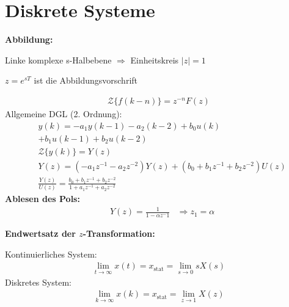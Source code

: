 \setcounter{section}{16}
\section{Diskrete Systeme}
\begin{tcolorbox}[colback=white!10!white,
                  colframe=green!30!black,
                  title=Zusammenhang $s$ und $z$]
\textbf{Abbildung:}

Linke komplexe s-Halbebene $\Longrightarrow$ Einheitskreis $|z|=1$

$z = e^{sT}$ ist die Abbildungsvorschrift
\end{tcolorbox}

\begin{tcolorbox}[colback=white!10!white,
                  colframe=green!30!black,
                  title=$z$-Übertragungsfunktion]
    \begin{align*}
        \mathcal{Z}\{ f(k-n)\} = z^{-n}F(z)
    \end{align*}
    Allgemeine DGL (2. Ordnung):
    \begin{align*}
        &y(k)    = -a_1y(k-1)-a_2(k-2)+b_0u(k)\\&+b_1u(k-1)+b_2u(k-2)\\
        &\mathcal{Z}\{ y(k)\}  = Y(z)\\
        &Y(z) = (-a_1z^{-1}-a_2z^{-2})Y(z) 
        +(b_0+b_1z^{-1}+b_2z^{-2})U(z)\\
        &\frac{Y(z)}{U(z)} = \frac{b_0+b_1z^{-1}+b_2z^{-2}}{1+a_1z^{-1}+a_2z^{-2}}
    \end{align*}
    \textbf{Ablesen des Pols:}
    \begin{align*}
        & Y(z) = \frac{1}{1-\alpha z^-1} &\Rightarrow z_1 = \alpha
    \end{align*}
    \begin{tcolorbox}[colback=white!10!white,colframe=green!30!black]
        \textbf{Endwertsatz der $z$-Transformation:}
        
        Kontinuierliches System:
        \begin{align*}
            \lim\limits_{t\to\infty} x(t) = x_{\text{stat}} = \lim\limits_{s\to 0 }sX(s)
        \end{align*}
        Diskretes System:
        \begin{align*}
             \lim\limits_{k\to\infty} x(k) =  x_{\text{stat}} = \lim\limits_{z\to 1 }X(z)
        \end{align*}
    \end{tcolorbox}
\end{tcolorbox}


